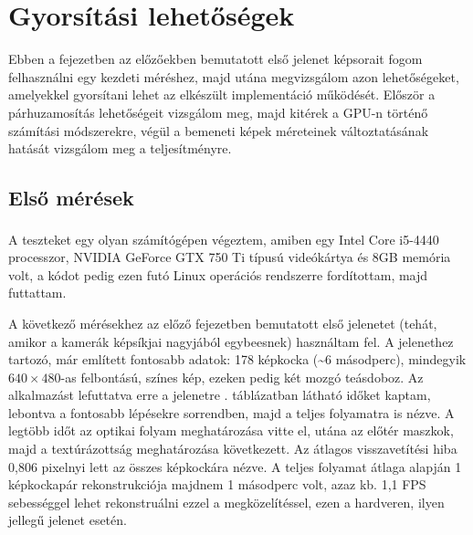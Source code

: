 \chapter{Gyorsítási lehetőségek}

Ebben a fejezetben az előzőekben bemutatott első jelenet képsorait fogom felhasználni egy kezdeti méréshez, majd utána megvizsgálom azon lehetőségeket, amelyekkel gyorsítani lehet az elkészült implementáció működését. Először a párhuzamosítás lehetőségeit vizsgálom meg, majd kitérek a GPU-n történő számítási módszerekre, végül a bemeneti képek méreteinek változtatásának hatását vizsgálom meg a teljesítményre.

\section{Első mérések}

A teszteket egy olyan számítógépen végeztem, amiben egy Intel\textsuperscript{\textregistered} Core\texttrademark{} i5-4440 processzor, NVIDIA GeForce GTX 750 Ti típusú videókártya és 8GB memória volt, a kódot pedig ezen futó Linux operációs rendszerre fordítottam, majd futtattam.

A következő mérésekhez az előző fejezetben bemutatott első jelenetet (tehát, amikor a kamerák képsíkjai nagyjából egybeesnek) használtam fel. A jelenethez tartozó, már említett fontosabb adatok: 178 képkocka (\textasciitilde 6 másodperc), mindegyik $640\times 480$-as felbontású, színes kép, ezeken pedig két mozgó teásdoboz. Az alkalmazást lefuttatva erre a jelenetre . táblázatban látható időket kaptam, lebontva a fontosabb lépésekre sorrendben, majd a teljes folyamatra is nézve. A legtöbb időt az optikai folyam meghatározása vitte el, utána az előtér maszkok, majd a textúrázottság meghatározása következett. Az átlagos visszavetítési hiba 0,806 pixelnyi lett az összes képkockára nézve. A teljes folyamat átlaga alapján 1 képkockapár rekonstrukciója majdnem 1 másodperc volt, azaz kb. 1,1 FPS sebességgel lehet rekonstruálni ezzel a megközelítéssel, ezen a hardveren, ilyen jellegű jelenet esetén.

